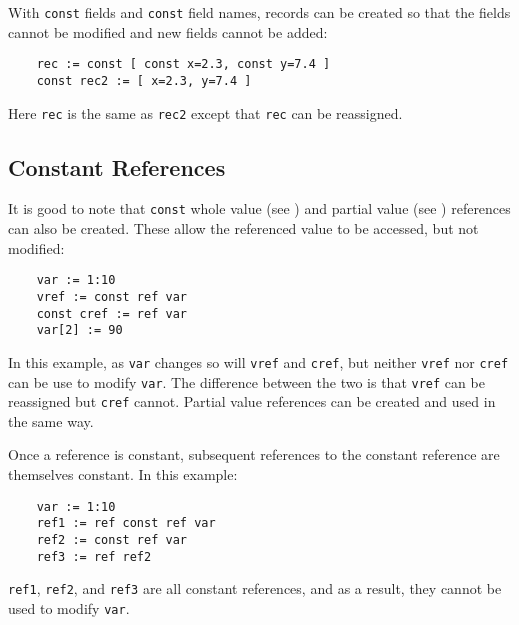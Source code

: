 With {\tt const} fields and {\tt const} field names, records can be
created so that the fields cannot be modified and new fields cannot
be added:
\begin{verbatim}
    rec := const [ const x=2.3, const y=7.4 ]
    const rec2 := [ x=2.3, y=7.4 ]
\end{verbatim}
Here {\tt rec} is the same as {\tt rec2} except that {\tt rec} can
be reassigned.

\subsection{Constant References}
\label{const-reference}
\label{last-const}

It is good to note that {\tt const} whole value (see ) and partial value
(see ) references can also be created. These
allow the referenced value to be accessed, but not modified:
\begin{verbatim}
    var := 1:10
    vref := const ref var
    const cref := ref var
    var[2] := 90
\end{verbatim}
In this example, as {\tt var} changes so will {\tt vref} and {\tt cref},
but neither {\tt vref} nor {\tt cref} can be use to modify {\tt var}. The
difference between the two is that {\tt vref} can be reassigned but {\tt cref}
cannot. Partial value references can be created and used in the same way.

Once a reference is constant, subsequent references to the constant reference
are themselves constant. In this example:
\begin{verbatim}
    var := 1:10
    ref1 := ref const ref var
    ref2 := const ref var
    ref3 := ref ref2
\end{verbatim}
{\tt ref1}, {\tt ref2}, and {\tt ref3} are all constant references, and
as a result, they cannot be used to modify {\tt var}.

